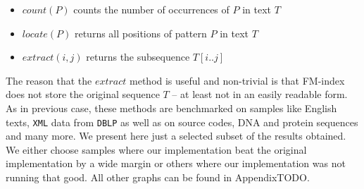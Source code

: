 \begin{itemize}
	\item $\mathit{count}(P)$ counts the number of occurrences of $P$ in text $T$
	\item $\mathit{locate}(P)$ returns all positions of pattern $P$ in text $T$
	\item $\mathit{extract}(i, j)$ returns the subsequence $T[i..j]$
\end{itemize}

The reason that the $\mathit{extract}$ method is useful and non-trivial is that FM-index
does not store the original sequence $T$ -- at least not in an easily readable form.
As in previous case, these methods are benchmarked on samples like English texts, \texttt{XML}
data from \texttt{DBLP} as well as on source codes, DNA and protein sequences and many more.
We present here just a selected subset of the results obtained. We either choose samples
where our implementation beat the original implementation by a wide margin or others where
our implementation was not running that good. All other graphs can be found in AppendixTODO.